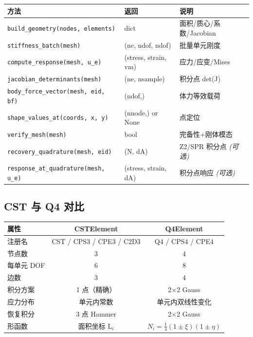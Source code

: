 \documentclass[12pt,a4paper]{ctexart}
\begin{document}
\begin{center}
\begin{tabular}{lll}
\hline
\textbf{方法} & \textbf{返回} & \textbf{说明} \\
\hline
\texttt{build\_geometry(nodes, elements)} & dict & 面积/质心/系数/Jacobian \\
\texttt{stiffness\_batch(mesh)} & (ne, ndof, ndof) & 批量单元刚度 \\
\texttt{compute\_response(mesh, u\_e)} & (stress, strain, vm) & 应力/应变/Mises \\
\texttt{jacobian\_determinants(mesh)} & (ne, nsample) & 积分点 det(J) \\
\texttt{body\_force\_vector(mesh, eid, bf)} & (ndof,) & 体力等效载荷 \\
\texttt{shape\_values\_at(coords, x, y)} & (nnode,) or None & 点定位 \\
\texttt{verify\_mesh(mesh)} & bool & 完备性+刚体模态 \\
\hline
\texttt{recovery\_quadrature(mesh, eid)} & (N, dA) & Z2/SPR 积分点 \textit{(可选)} \\
\texttt{response\_at\_quadrature(mesh, u\_e)} & (stress, strain, dA) & 积分点响应 \textit{(可选)} \\
\hline
\end{tabular}
\end{center}

\subsection{CST 与 Q4 对比}

\begin{center}
\begin{tabular}{lcc}
\hline
\textbf{属性} & \textbf{CSTElement} & \textbf{Q4Element} \\
\hline
注册名 & CST / CPS3 / CPE3 / C2D3 & Q4 / CPS4 / CPE4 \\
节点数 & 3 & 4 \\
每单元 DOF & 6 & 8 \\
边数 & 3 & 4 \\
积分方案 & 1 点（精确） & 2$\times$2 Gauss \\
应力分布 & 单元内常数 & 单元内双线性变化 \\
恢复积分 & 3 点 Hammer & 2$\times$2 Gauss \\
形函数 & 面积坐标 L$_i$ & $N_i = \frac{1}{4}(1\pm\xi)(1\pm\eta)$ \\
\hline
\end{tabular}
\end{center}
\end{document}
